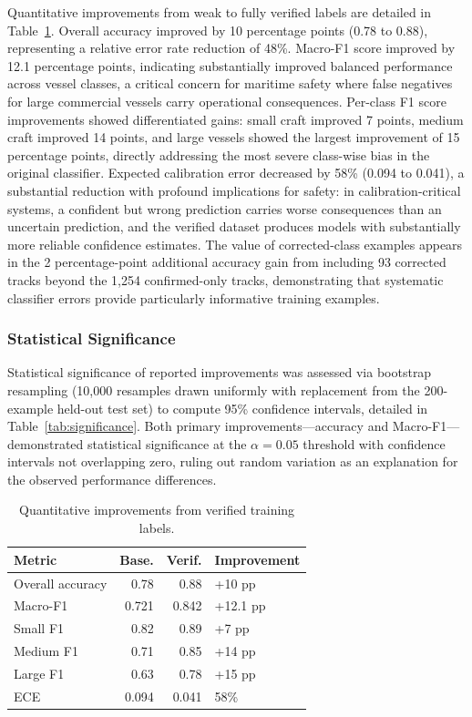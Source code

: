 \documentclass[conf]{asmeconf}
\begin{document}
Quantitative improvements from weak to fully verified labels are detailed in Table~\ref{tab:improvements}. Overall accuracy improved by 10 percentage points (0.78 to 0.88), representing a relative error rate reduction of 48\%. Macro-F1 score improved by 12.1 percentage points, indicating substantially improved balanced performance across vessel classes, a critical concern for maritime safety where false negatives for large commercial vessels carry operational consequences. Per-class F1 score improvements showed differentiated gains: small craft improved 7 points, medium craft improved 14 points, and large vessels showed the largest improvement of 15 percentage points, directly addressing the most severe class-wise bias in the original classifier. Expected calibration error decreased by 58\% (0.094 to 0.041), a substantial reduction with profound implications for safety: in calibration-critical systems, a confident but wrong prediction carries worse consequences than an uncertain prediction, and the verified dataset produces models with substantially more reliable confidence estimates. The value of corrected-class examples appears in the 2 percentage-point additional accuracy gain from including 93 corrected tracks beyond the 1,254 confirmed-only tracks, demonstrating that systematic classifier errors provide particularly informative training examples.

\subsubsection{Statistical Significance}

Statistical significance of reported improvements was assessed via bootstrap resampling (10,000 resamples drawn uniformly with replacement from the 200-example held-out test set) to compute 95\% confidence intervals, detailed in Table~\ref{tab:significance}. Both primary improvements—accuracy and Macro-F1—demonstrated statistical significance at the $\alpha = 0.05$ threshold with confidence intervals not overlapping zero, ruling out random variation as an explanation for the observed performance differences.

\begin{table}[t]
\caption{Quantitative improvements from verified training labels.}
\label{tab:improvements}
\centering
\small
\begin{tabular}{@{}lrrp{2.5cm}@{}}
\toprule
Metric & Base. & Verif. & Improvement \\
\midrule
Overall accuracy & 0.78 & 0.88 & +10 pp \\
\midrule
Macro-F1 & 0.721 & 0.842 & +12.1 pp \\
\midrule
Small F1 & 0.82 & 0.89 & +7 pp \\
\midrule
Medium F1 & 0.71 & 0.85 & +14 pp \\
\midrule
Large F1 & 0.63 & 0.78 & +15 pp \\
\midrule
ECE & 0.094 & 0.041 & 58\% \\
\bottomrule
\end{tabular}
\end{table}
\end{document}

